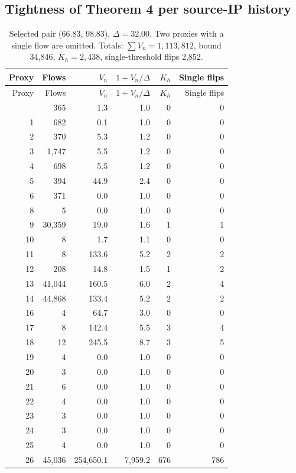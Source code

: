 \subsection{Tightness of Theorem 4 per source-IP history}
{\footnotesize\setlength{\tabcolsep}{4pt}
\begin{longtable}{rrrrrr}
\caption{Selected pair (66.83, 98.83), $\Delta=32.00$. Two proxies with a single flow are omitted. Totals: $\sum V_n=1,113,812$, bound 34,846, $K_h=2,438$, single-threshold flips 2,852.}\label{tab:s7_thm4}\\
\toprule
Proxy & Flows & $V_n$ & $1+V_n/\Delta$ & $K_h$ & Single flips\\
\midrule
\endfirsthead
\toprule
Proxy & Flows & $V_n$ & $1+V_n/\Delta$ & $K_h$ & Single flips\\
\midrule
\endhead
\bottomrule
\endfoot
0 & 365 & 1.3 & 1.0 & 0 & 0\\
1 & 682 & 0.1 & 1.0 & 0 & 0\\
2 & 370 & 5.3 & 1.2 & 0 & 0\\
3 & 1,747 & 5.5 & 1.2 & 0 & 0\\
4 & 698 & 5.5 & 1.2 & 0 & 0\\
5 & 394 & 44.9 & 2.4 & 0 & 0\\
6 & 371 & 0.0 & 1.0 & 0 & 0\\
8 & 5 & 0.0 & 1.0 & 0 & 0\\
9 & 30,359 & 19.0 & 1.6 & 1 & 1\\
10 & 8 & 1.7 & 1.1 & 0 & 0\\
11 & 8 & 133.6 & 5.2 & 2 & 2\\
12 & 208 & 14.8 & 1.5 & 1 & 2\\
13 & 41,044 & 160.5 & 6.0 & 2 & 4\\
14 & 44,868 & 133.4 & 5.2 & 2 & 2\\
16 & 4 & 64.7 & 3.0 & 0 & 0\\
17 & 8 & 142.4 & 5.5 & 3 & 4\\
18 & 12 & 245.5 & 8.7 & 3 & 5\\
19 & 4 & 0.0 & 1.0 & 0 & 0\\
20 & 3 & 0.0 & 1.0 & 0 & 0\\
21 & 6 & 0.0 & 1.0 & 0 & 0\\
22 & 4 & 0.0 & 1.0 & 0 & 0\\
23 & 3 & 0.0 & 1.0 & 0 & 0\\
24 & 3 & 0.0 & 1.0 & 0 & 0\\
25 & 4 & 0.0 & 1.0 & 0 & 0\\
26 & 45,036 & 254,650.1 & 7,959.2 & 676 & 786\\

\end{longtable}}
